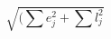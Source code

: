 \documentclass{minimal}
\begin{document}
\begin{equation}
\sqrt{(\sum e_j^2 + \sum l_j^2}
\end{equation}
\end{document}
